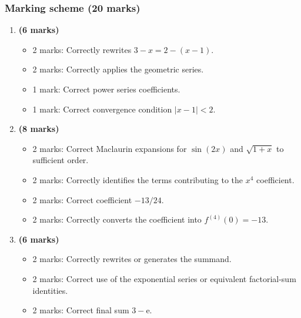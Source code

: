 \documentclass[12pt]{article}
\newcommand{\ee}{\mathrm{e}}
\begin{document}
\subsubsection{Marking scheme (20 marks)}

\begin{enumerate}[label=(\alph*)]
\item \textbf{(6 marks)}
\begin{itemize}
\item 2 marks: Correctly rewrites $3-x=2-(x-1)$.
\item 2 marks: Correctly applies the geometric series.
\item 1 mark: Correct power series coefficients.
\item 1 mark: Correct convergence condition $|x-1|<2$.
\end{itemize}

\item \textbf{(8 marks)}
\begin{itemize}
\item 2 marks: Correct Maclaurin expansions for $\sin(2x)$ and $\sqrt{1+x}$ to sufficient order.
\item 2 marks: Correctly identifies the terms contributing to the $x^4$ coefficient.
\item 2 marks: Correct coefficient $-13/24$.
\item 2 marks: Correctly converts the coefficient into $f^{(4)}(0)=-13$.
\end{itemize}

\item \textbf{(6 marks)}
\begin{itemize}
\item 2 marks: Correctly rewrites or generates the summand.
\item 2 marks: Correct use of the exponential series or equivalent factorial-sum identities.
\item 2 marks: Correct final sum $3-\ee$.
\end{itemize}
\end{enumerate}
\end{document}
